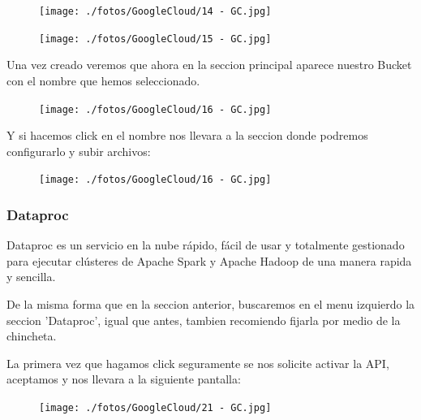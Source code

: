 \documentclass[a4paper,10pt]{article}
\begin{document}
\begin{figure}[H]
\begin{center}
\texttt{[image: ./fotos/GoogleCloud/14 - GC.jpg]}
\end{center}
\end{figure}

\begin{figure}[H]
\begin{center}
\texttt{[image: ./fotos/GoogleCloud/15 - GC.jpg]}
\end{center}
\end{figure}

Una vez creado veremos que ahora en la seccion principal aparece nuestro Bucket con el nombre que hemos seleccionado.

\begin{figure}[H]
\begin{center}
\texttt{[image: ./fotos/GoogleCloud/16 - GC.jpg]}
\end{center}
\end{figure}

Y si hacemos click en el nombre nos llevara a la seccion donde podremos configurarlo y subir archivos:

\begin{figure}[H]
\begin{center}
\texttt{[image: ./fotos/GoogleCloud/16 - GC.jpg]}
\end{center}
\end{figure}

\subsubsection{Dataproc}

Dataproc es un servicio en la nube rápido, fácil de usar y totalmente gestionado para ejecutar clústeres de Apache Spark y Apache Hadoop de una manera rapida y sencilla.

De la misma forma que en la seccion anterior, buscaremos en el menu izquierdo la seccion 'Dataproc', igual que antes, tambien recomiendo fijarla por medio de la chincheta. 

La primera vez que hagamos click seguramente se nos solicite activar la API, aceptamos y nos llevara a la siguiente pantalla:

\begin{figure}[H]
\begin{center}
\texttt{[image: ./fotos/GoogleCloud/21 - GC.jpg]}
\end{center}
\end{figure}
\end{document}
